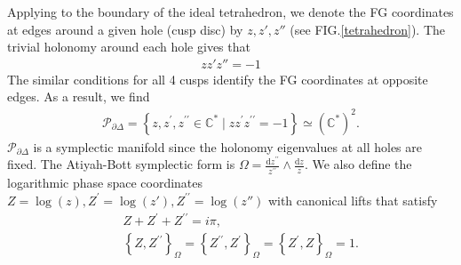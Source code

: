 \documentclass[aps,prd,notitlepage,nofootinbib,superscriptaddress,groupedaddress,twocolumn]{revtex4-1}
\def\be{\begin{eqnarray}}
\def\ee{\end{eqnarray}}
\renewcommand{\O}{\Omega}
\newcommand{\rmd}{\mathrm d}
\begin{document}
Applying to the boundary of the ideal tetrahedron, we denote the FG coordinates at edges around a given hole (cusp disc) by $z,z',z''$ (see FIG.\ref{tetrahedron}). The trivial holonomy around each hole gives that 
\be
zz'z''=-1
\ee
The similar conditions for all 4 cusps identify the FG coordinates at opposite edges. As a result, we find
\be 
\mathcal{P}_{\partial \Delta}=\left\{z, z^{\prime}, z^{\prime \prime} \in \mathbb{C}^{*} \mid z z^{\prime} z^{\prime \prime}=-1\right\} \simeq\left(\mathbb{C}^{*}\right)^{2}.
\ee
$\mathcal{P}_{\partial \Delta}$ is a symplectic manifold since the holonomy eigenvalues at all holes are fixed. The Atiyah-Bott symplectic form is $\Omega=\frac{\rmd z^{\prime\prime}}{z^{\prime\prime}}\wedge \frac{\rmd z}{z} $. We also define the logarithmic phase space coordinates $Z=\log(z),Z^{\prime}=\log(z'),Z^{\prime \prime}=\log(z'')$ with canonical lifts that satisfy
\be
&&Z+Z^{\prime}+Z^{\prime \prime}=i \pi, \label{ZZZipi}\\
&&\left\{Z, Z^{\prime\prime}\right\}_\O=\left\{Z^{\prime\prime}, Z^{\prime }\right\}_\O=\left\{Z^{\prime }, Z\right\}_\O=1.
\ee
 
\end{document}
